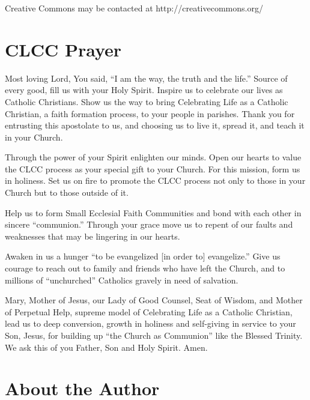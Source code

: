 \documentclass[oneside]{book}
\begin{document}
Creative Commons may be contacted at http://creativecommons.org/


\chapter{CLCC Prayer}

Most loving Lord, You said, ``I am the way, the truth and the life.''  Source of
every good, fill us with your Holy Spirit.  Inspire us to celebrate our lives as
Catholic Christians.  Show us the way to bring Celebrating Life as a Catholic
Christian, a faith formation process, to your people in parishes. Thank you for
entrusting this apostolate to us, and choosing us to live it, spread it, and
teach it in your Church.

Through the power of your Spirit enlighten our minds.  Open our hearts to value
the CLCC process as your special gift to your Church. For this mission, form us
in holiness. Set us on fire to promote the CLCC process not only to those in
your Church but to those outside of it.

Help us to form Small Ecclesial Faith Communities and bond with each other in
sincere ``communion.''  Through your grace move us to repent of our faults and
weaknesses that may be lingering in our hearts.

Awaken in us a hunger ``to be evangelized [in order to] evangelize.'' Give us
courage to reach out to family and friends who have left the Church, and to
millions of ``unchurched'' Catholics gravely in need of salvation.

Mary, Mother of Jesus, our Lady of Good Counsel, Seat of Wisdom, and Mother of
Perpetual Help, supreme model of Celebrating Life as a Catholic Christian, lead
us to deep conversion, growth in holiness and self-giving in service to your
Son, Jesus, for building up ``the Church as Communion'' like the Blessed
Trinity. We ask this of you Father, Son and Holy Spirit. Amen.


\chapter{About the Author}
\end{document}
